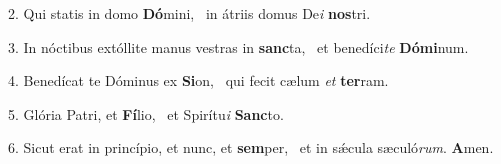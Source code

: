 2. Qui statis in domo \textbf{Dó}mini, \ast\  in átriis domus De\textit{i} \textbf{nos}tri.\

3. In nóctibus extóllite manus vestras in \textbf{sanc}ta, \ast\  et benedíci\textit{te} \textbf{Dó}\textbf{mi}num.\

4. Benedícat te Dóminus ex \textbf{Si}on, \ast\  qui fecit cælum \textit{et} \textbf{ter}ram.\

5. Glória Patri, et \textbf{Fí}lio, \ast\  et Spirítu\textit{i} \textbf{Sanc}to.\

6. Sicut erat in princípio, et nunc, et \textbf{sem}per, \ast\  et in sǽcula sæculó\textit{rum}. \textbf{A}men.\

